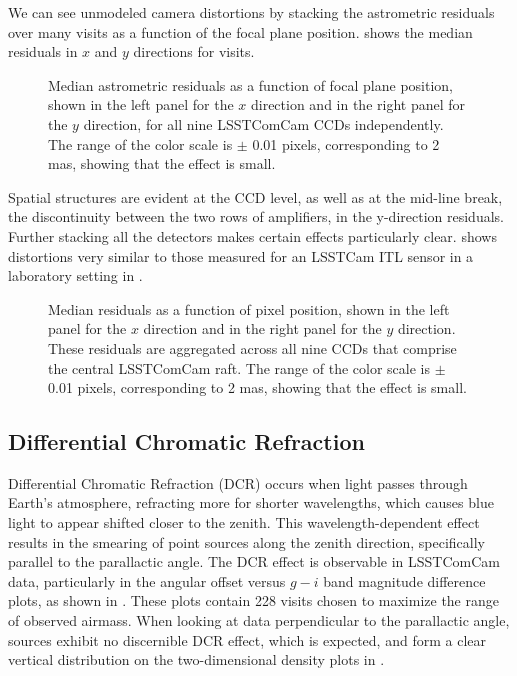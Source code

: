 We can see unmodeled camera distortions by stacking the astrometric residuals over many visits as a function of the focal plane position.
 shows the median residuals in $x$ and $y$ directions for \nvisits visits.
\begin{figure}[htb!]
\caption{Median astrometric residuals  as a function of focal plane position, shown in the left panel for the $x$ direction and in the right panel for the $y$ direction, for all nine LSSTComCam CCDs independently.
The range of the color scale is $\pm$ 0.01 pixels, corresponding to 2 mas, showing that the effect is small. }
\label{fig:Astrometry_FoV}
\end{figure}
Spatial structures are evident at the \gls{CCD} level, as well as at the mid-line break,  the discontinuity between the two rows of amplifiers,  in the y-direction residuals.
Further stacking all the detectors makes certain effects particularly clear.
 shows distortions very similar to those measured for an \gls{LSSTCam} \gls{ITL} sensor in a laboratory setting in \citet{2023PASP..135k5003E}.
\begin{figure}[htb!]
\caption{Median residuals as a function of pixel position, shown in the left panel for the $x$ direction and in the right panel for the $y$ direction. 
These residuals are aggregated across all nine CCDs that comprise the central LSSTComCam raft.
The range of the color scale is $\pm$ 0.01 pixels, corresponding to 2 mas, showing that the effect is small.}
\label{fig:Astrometry_CCD}
\end{figure}

\subsection{Differential Chromatic Refraction}
\label{sec:differential_chromatic_refraction}
\gls{Differential Chromatic Refraction} (DCR) occurs when light passes through Earth’s atmosphere, refracting more for shorter wavelengths, which causes blue light to appear shifted closer to the zenith.
This wavelength-dependent effect results in the smearing of point sources along the zenith direction, specifically parallel to the parallactic angle.
The DCR effect is observable in LSSTComCam data, particularly in the angular offset versus $g-i$ band magnitude difference plots,  as shown in . 
These plots contain 228 visits chosen to maximize the range of observed airmass.
When looking at data perpendicular to the parallactic angle, sources exhibit no discernible DCR effect, which is expected, and form a clear vertical distribution on the two-dimensional density plots in .

